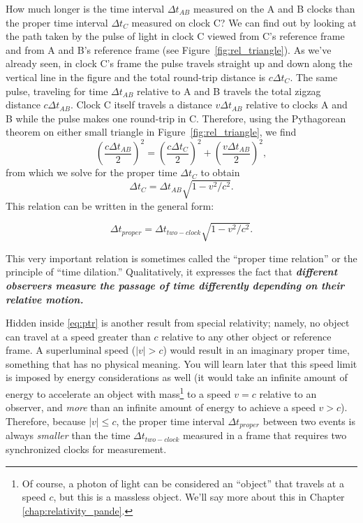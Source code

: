 How much longer is the time interval $\Delta t_{AB}$ measured on the A
and B clocks than the proper time interval $\Delta t_C$ measured on
clock C?  We can find out by looking at the path taken by the pulse of
light in clock C viewed from C's reference frame and from A and B's
reference frame (see Figure~\ref{fig:rel_triangle}).  As we've already
seen, in clock C's frame the pulse travels straight up and down along
the vertical line in the figure and the total round-trip distance is
$c\Delta t_C$.  The same pulse, traveling for time $\Delta t_{AB}$
relative to A and B travels the total zigzag distance $c\Delta
t_{AB}$.  Clock C itself travels a distance $v\Delta t_{AB}$ relative
to clocks A and B while the pulse makes one round-trip in C.
Therefore, using the Pythagorean theorem on either small triangle in
Figure~\ref{fig:rel_triangle}, we find
\begin{equation}
\left(\frac{c\Delta t_{AB}}{2}\right)^2 = 
\left(\frac{c\Delta t_{C}}{2}\right)^2 + 
\left(\frac{v\Delta t_{AB}}{2}\right)^2,
\end{equation}
from which we solve for the proper time $\Delta t_C$ to obtain
\begin{equation}
\Delta t_C = \Delta t_{AB}\sqrt{1 - v^2/c^2}.
\end{equation}
This relation can be written in the general form:

\begin{lemma}
\begin{equation}
\Delta t_{ proper} = \Delta t_{ two-clock}\sqrt{1 - v^2/c^2}.
\label{eq:ptr}
\end{equation}
\end{lemma}

 This very important relation is sometimes called the
``proper time relation'' or the principle of ``time dilation.''
Qualitatively, it expresses the fact that \textbf{\emph{different
observers measure the passage of time differently depending on their 
relative motion.}}
   
Hidden inside \eqref{eq:ptr} is another result from special
relativity; namely, no object can travel at a speed greater than $c$
relative to any other object or reference frame.  A superluminal speed
($|v| > c$) would result in an imaginary proper time, something that
has no physical meaning.  You will learn later that this speed limit
is imposed by energy considerations as well (it would take an infinite
amount of energy to accelerate an object with mass\footnote{Of course,
a photon of light can be considered an ``object'' that travels at 
a speed $c$, but this is a massless object.  We'll say more about this 
in Chapter \ref{chap:relativity_pande}.} to a speed $v = c$
relative to an observer, and \emph{more} than an infinite amount of
energy to achieve a speed $v > c$).  Therefore, because $|v| \leq c$,
the proper time interval $\Delta t_{ proper}$ between two events
is always \emph{smaller} than the time $\Delta t_{ two-clock}$
measured in a frame that requires two synchronized clocks for
measurement.

